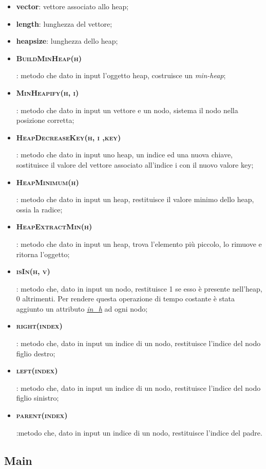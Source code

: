 \begin{itemize}
    \item \textbf{vector}: vettore associato allo heap;
    \item \textbf{length}: lunghezza del vettore;
    \item \textbf{heapsize}: lunghezza dello heap;
    \item \hypertarget{buildminheap}{\textbf{\textsc{BuildMinHeap(h)}}}: metodo che dato in input l'oggetto heap, costruisce un \textit{min-heap};
    \item \hypertarget{minheapify}{\textbf{\textsc{MinHeapify(h, i)}}}: metodo che dato in input un vettore e un nodo, sistema il nodo nella posizione corretta;
    \item \hypertarget{heapdecreasekey}{\textbf{\textsc{HeapDecreaseKey(h, i ,key)}}}: metodo che dato in input uno heap, un indice ed una nuova chiave, sostituisce il valore del vettore associato all'indice i con il nuovo valore key;
    \item \hypertarget{heapminimum}{\textbf{\textsc{HeapMinimum(h)}}}: metodo che dato in input un heap, restituisce il valore minimo dello heap, ossia la radice;
    \item \hypertarget{heapextractmin}{\textbf{\textsc{HeapExtractMin(h)}}}: metodo che dato in input un heap, trova l'elemento più piccolo, lo rimuove e ritorna l'oggetto;
    \item \hypertarget{isin}{\textbf{\textsc{isIn(h, v)}}}: metodo che, dato in input un nodo, restituisce 1 se esso è presente nell'heap, 0 altrimenti. Per rendere questa operazione di tempo costante è stata aggiunto un attributo \hyperlink{inh}{\textit{in\_h}} ad ogni nodo;
    \item \hypertarget{right}{\textbf{\textsc{right(index)}}}: metodo che, dato in input un indice di un nodo, restituisce l'indice del nodo figlio destro;
    \item \hypertarget{left}{\textbf{\textsc{left(index)}}}: metodo che, dato in input un indice di un nodo, restituisce l'indice del nodo figlio sinistro;
    \item \hypertarget{parent}{\textbf{\textsc{parent(index)}}}:metodo che, dato in input un indice di un nodo, restituisce l'indice del padre.
\end{itemize}


\newpage


\subsection{Main}
\label{Main}

